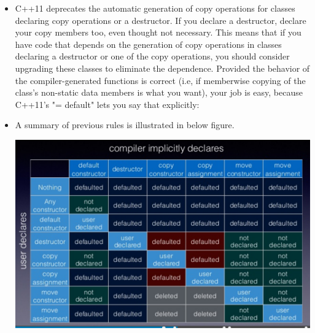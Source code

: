 \documentclass[a4paper,11pt,twoside]{book}
\begin{document}
\begin{itemize}
	\item C++11 deprecates the automatic generation of copy operations for classes declaring copy operations or a destructor. If you declare a destructor, declare your copy members too, even thought not necessary. This means that if you have code that depends on the generation of copy operations in classes declaring a destructor or one of the copy operations, you should consider upgrading these classes to eliminate the dependence.  Provided the behavior of the compiler-generated functions is correct (i.e, if memberwise copying of the class's non-static data members is what you want), your job is easy, because C++11's "= default" lets you say that explicitly:
		
	\item A summary of previous rules is illustrated in below figure. 
	\begin{center}
		\includegraphics[scale=0.6]{pics/sm3.png}
	\end{center}

	



\end{itemize}
\end{document}
